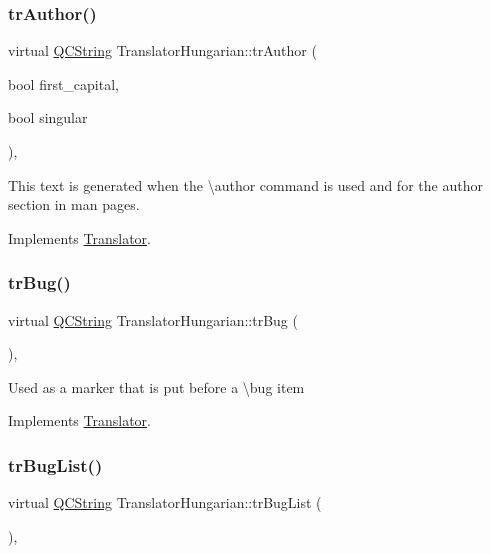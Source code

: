 \subsubsection{\texorpdfstring{trAuthor()}{trAuthor()}}
{\footnotesize\ttfamily virtual \mbox{\hyperlink{class_q_c_string}{Q\+C\+String}} Translator\+Hungarian\+::tr\+Author (\begin{DoxyParamCaption}\item[{bool}]{first\+\_\+capital,  }\item[{bool}]{singular }\end{DoxyParamCaption})\hspace{0.3cm}{\ttfamily [inline]}, {\ttfamily [virtual]}}

This text is generated when the \textbackslash{}author command is used and for the author section in man pages. 

Implements \mbox{\hyperlink{class_translator}{Translator}}.

\mbox{\label{class_translator_hungarian_a9b8f93611a494a7c149033197a47d558}} 
\subsubsection{\texorpdfstring{trBug()}{trBug()}}
{\footnotesize\ttfamily virtual \mbox{\hyperlink{class_q_c_string}{Q\+C\+String}} Translator\+Hungarian\+::tr\+Bug (\begin{DoxyParamCaption}{ }\end{DoxyParamCaption})\hspace{0.3cm}{\ttfamily [inline]}, {\ttfamily [virtual]}}

Used as a marker that is put before a \textbackslash{}bug item 

Implements \mbox{\hyperlink{class_translator}{Translator}}.

\mbox{\label{class_translator_hungarian_ab68b764947211238dcabe72467feec23}} 
\subsubsection{\texorpdfstring{trBugList()}{trBugList()}}
{\footnotesize\ttfamily virtual \mbox{\hyperlink{class_q_c_string}{Q\+C\+String}} Translator\+Hungarian\+::tr\+Bug\+List (\begin{DoxyParamCaption}{ }\end{DoxyParamCaption})\hspace{0.3cm}{\ttfamily [inline]}, {\ttfamily [virtual]}}


